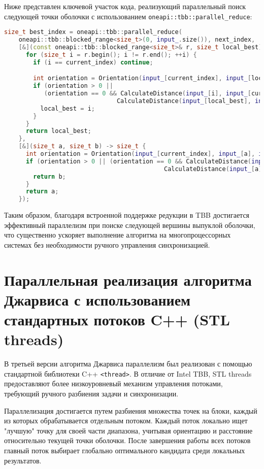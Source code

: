\documentclass[a4paper,12pt]{article}
\begin{document}
\begin{itemize}
Ниже представлен ключевой участок кода, реализующий параллельный поиск следующей точки оболочки с использованием \texttt{oneapi::tbb::parallel\_reduce}:

\begin{lstlisting}[language=C++, caption={Параллельный выбор следующей точки оболочки с использованием Intel TBB}]
size_t best_index = oneapi::tbb::parallel_reduce(
    oneapi::tbb::blocked_range<size_t>(0, input_.size()), next_index,
    [&](const oneapi::tbb::blocked_range<size_t>& r, size_t local_best) -> size_t {
      for (size_t i = r.begin(); i != r.end(); ++i) {
        if (i == current_index) continue;

        int orientation = Orientation(input_[current_index], input_[local_best], input_[i]);
        if (orientation > 0 || 
           (orientation == 0 && CalculateDistance(input_[i], input_[current_index]) > 
                               CalculateDistance(input_[local_best], input_[current_index]))) {
          local_best = i;
        }
      }
      return local_best;
    },
    [&](size_t a, size_t b) -> size_t {
      int orientation = Orientation(input_[current_index], input_[a], input_[b]);
      if (orientation > 0 || (orientation == 0 && CalculateDistance(input_[b], input_[current_index]) >
                                            CalculateDistance(input_[a], input_[current_index]))) {
        return b;
      }
      return a;
    });
\end{lstlisting}

Таким образом, благодаря встроенной поддержке редукции в TBB достигается эффективный параллелизм при поиске следующей вершины выпуклой оболочки, что существенно ускоряет выполнение алгоритма на многопроцессорных системах без необходимости ручного управления синхронизацией.

\newpage
\section{Параллельная реализация алгоритма Джарвиса с использованием стандартных потоков C++ (STL threads)}

В третьей версии алгоритма Джарвиса параллелизм был реализован с помощью стандартной библиотеки C++ \texttt{<thread>}. В отличие от Intel TBB, STL threads предоставляют более низкоуровневый механизм управления потоками, требующий ручного разбиения задачи и синхронизации.

Параллелизация достигается путем разбиения множества точек на блоки, каждый из которых обрабатывается отдельным потоком. Каждый поток локально ищет "лучшую" точку для своей части диапазона, учитывая ориентацию и расстояние относительно текущей точки оболочки. После завершения работы всех потоков главный поток выбирает глобально оптимального кандидата среди локальных результатов.


\end{itemize}
\end{document}
